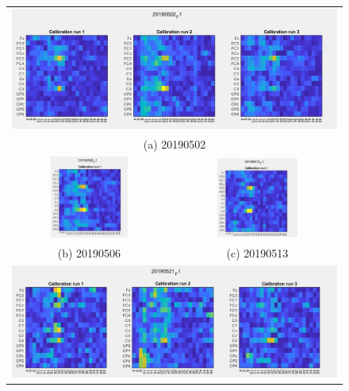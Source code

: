 \begin{figure}
\begin{tabular}{cc}
    \multicolumn{2}{c}{\includegraphics[width=1\textwidth]{Figure/20190502_FS.JPG} }\\
    \multicolumn{2}{c}{(a) 20190502}\\
    \includegraphics[width=0.5\textwidth]{Figure/20190506_FS.JPG} &   \includegraphics[width=0.5\textwidth]{Figure/20190513_FS.JPG} \\
    (b) 20190506 & (c) 20190513 \\
    \multicolumn{2}{c}{\includegraphics[width=1\textwidth]{Figure/20190521_FS.JPG} }\\

\end{tabular}
\end{figure}
